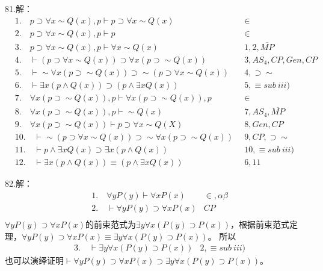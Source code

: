 \documentclass[a4paper]{ctexart}
\begin{document}
\noindent 81.解：
\begin{align*}
  &1. \quad p\supset\forall{x}\sim Q(x),p \vdash p\supset\forall{x}\sim Q(x) \quad &\in \\
  &2. \quad p\supset\forall{x}\sim Q(x),p \vdash p \quad &\in \\
  &3. \quad p\supset\forall{x}\sim Q(x),p \vdash \forall{x}\sim Q(x) \quad &1,2,\overline{MP} \\
  &4. \quad \vdash (p\supset\forall{x}\sim Q(x))\supset\forall{x}(p\supset\sim Q(x)) \quad &3,AS_4,CP,Gen,CP\\
  &5. \quad \vdash \sim\forall{x}(p\supset\sim Q(x))\supset\sim(p\supset\forall{x}\sim Q(x)) \quad &4,\supset\sim\\
  &6. \quad \vdash \exists{x}(p\wedge Q(x))\supset(p\wedge\exists{x}Q(x)) &5,\equiv sub\ iii)\\
  &7. \quad \forall{x}(p\supset\sim Q(x)),p \vdash \forall{x}(p\supset\sim Q(x)),p &\in \\
  &8. \quad \forall{x}(p\supset\sim Q(x)),p \vdash \sim Q(x) &7,AS_4,\overline{MP} \\
  &9. \quad \forall{x}(p\supset\sim Q(x))\vdash p\supset \forall{x}\sim Q(X) &8,Gen,CP\\
  &10. \quad \vdash \sim(p\supset\forall{x}\sim Q(x))\supset\sim\forall{x}(p\supset\sim Q(x)) &9,CP,\supset\sim \\
  &11. \quad \vdash p\wedge \exists{x}Q(x)\supset\exists{x}(p\wedge Q(x)) &10,\equiv sub\ iii) \\
  &12. \quad \vdash \exists{x}(p\wedge Q(x))\equiv (p\wedge\exists{x}Q(x)) &6,11
\end{align*}

\noindent 82.解：
\begin{align*}
  &1. \quad \forall{y}P(y)\vdash \forall{x}P(x) &\in,\alpha\beta \\
  &2. \quad \vdash \forall{y}P(y)\supset\forall{x}P(x) &CP \\
\end{align*}
$\forall{y}P(y)\supset\forall{x}P(x)$的前束范式为$\exists{y}\forall{x}(P(y)\supset P(x))$，根据前束范式定理，$\forall{y}P(y)\supset\forall{x}P(x)\equiv \exists{y}\forall{x}(P(y)\supset P(x))$。
所以
\begin{align*}
  &3. \quad \vdash \exists{y}\forall{x}(P(y)\supset P(x)) &2,\equiv sub\ iii)
\end{align*}
也可以演绎证明$\vdash \forall{y}P(y)\supset\forall{x}P(x)\supset \exists{y}\forall{x}(P(y)\supset P(x))$。\newline
\end{document}
